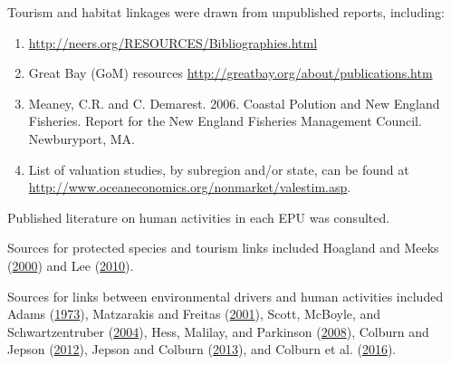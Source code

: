 \documentclass[
]{book}
\begin{document}
Tourism and habitat linkages were drawn from unpublished reports, including:

\begin{enumerate}
\def\labelenumi{\arabic{enumi}.}
\item
  \url{http://neers.org/RESOURCES/Bibliographies.html}
\item
  Great Bay (GoM) resources \url{http://greatbay.org/about/publications.htm}
\item
  Meaney, C.R. and C. Demarest. 2006. Coastal Polution and New England Fisheries. Report for the New England Fisheries Management Council. Newburyport, MA.
\item
  List of valuation studies, by subregion and/or state, can be found at \url{http://www.oceaneconomics.org/nonmarket/valestim.asp}.
\end{enumerate}

Published literature on human activities in each EPU was consulted.

Sources for protected species and tourism links included Hoagland and Meeks (\protect\hyperlink{ref-hoagland_demand_2000}{2000}) and Lee (\protect\hyperlink{ref-lee_economic_2010}{2010}).

Sources for links between environmental drivers and human activities included Adams (\protect\hyperlink{ref-adams_uncertainty_1973}{1973}), Matzarakis and Freitas (\protect\hyperlink{ref-matzarakis_proceedings_2001}{2001}), Scott, McBoyle, and Schwartzentruber (\protect\hyperlink{ref-scott_climate_2004}{2004}), Hess, Malilay, and Parkinson (\protect\hyperlink{ref-hess_climate_2008}{2008}), Colburn and Jepson (\protect\hyperlink{ref-colburn_social_2012}{2012}), Jepson and Colburn (\protect\hyperlink{ref-jepson_development_2013}{2013}), and Colburn et al. (\protect\hyperlink{ref-colburn_indicators_2016}{2016}).
\end{document}
